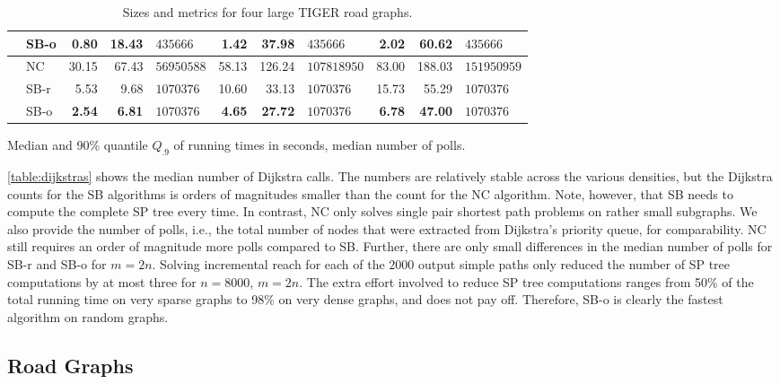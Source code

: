 \documentclass[runningheads,a4paper]{llncs}
\begin{document}
\begin{table}[tb]
\begin{subtable}[b]{1\textwidth}
\begin{tabularx}{1\textwidth}{p{0.8cm}p{0.8cm}|RR>{\RaggedLeft}p{1.4cm}|RR>{\RaggedLeft}p{1.5cm}|RR>{\RaggedLeft}p{1.5cm}}
 & \centering SB-o  & \textbf{0.80} & 18.43 & $\num{435666}$ & \textbf{1.42} & \textbf{37.98} & $\num{435666}$ & \textbf{2.02} & 60.62 & $\num{435666}$ \\
\hline
\centering{} & \centering NC & 30.15 & 67.43 & $\num{56950588}$ & 58.13 & 126.24 & $\num{107818950}$ & 83.00 & 188.03 & $\num{151950959}$ \\
 & \centering SB-r  & 5.53 & 9.68 & $\num{1070376}$ & 10.60 & 33.13 & $\num{1070376}$ & 15.73 & 55.29 & $\num{1070376}$ \\
 & \centering SB-o  & \textbf{2.54} & \textbf{6.81} & $\num{1070376}$ & \textbf{4.65} & \textbf{27.72} & $\num{1070376}$ & \textbf{6.78} & \textbf{47.00} & $\num{1070376}$ \\
\end{tabularx}
\caption{Median and 90\% quantile $Q_{.9}$ of running times in seconds, median number of polls.}
\label{table:tiger-times}
\end{subtable}
\vspace{-4mm}
\caption{Sizes and metrics for four large TIGER road graphs.}
\label{fig:tiger}
\end{table}

\autoref{table:dijkstras} shows the median number of Dijkstra calls.
The numbers are relatively stable across the various densities, but the Dijkstra counts for the SB algorithms is orders of magnitudes smaller than the count for the NC algorithm.
Note, however, that SB needs to compute the complete SP tree every time.
In contrast, NC only solves single pair shortest path problems on rather small subgraphs.
We also provide the number of polls, i.e.,  the total number of nodes that were extracted from Dijkstra's priority queue, for comparability.
NC still requires an order of magnitude more polls compared to SB.
Further, there are only small differences in the median number of polls for SB-r and SB-o for $m = 2n$.
Solving incremental reach for each of the $\num{2000}$ output simple paths only reduced the number of SP tree computations by at most three for $n = \num{8000}$, $m = 2n$.
The extra effort involved to reduce SP tree computations ranges from 50\% of the total running time on very sparse graphs to 98\% on very dense graphs, and does not pay off.
Therefore, SB-o is clearly the fastest algorithm on random graphs.

\subsection{Road Graphs}
\label{sec:road-graphs}
\end{document}

